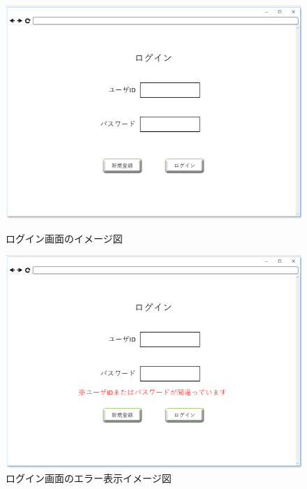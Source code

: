 \begin{figure}[htbp]
 \begin{minipage}{0.5\hsize}
  \begin{center}
   \includegraphics[width=1\linewidth,clip]{./img/01.png}
  \end{center}
  \caption{ログイン画面のイメージ図　　　　　}\label{fig:01}
 \end{minipage}
 \begin{minipage}{0.5\hsize}
  \begin{center}
   \includegraphics[width=1\linewidth,clip]{./img/02.png}
  \end{center}
  \caption{ログイン画面のエラー表示イメージ図}\label{fig:02}
 \end{minipage}
\end{figure}

